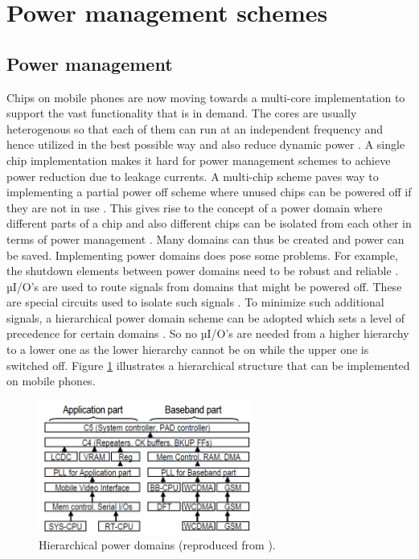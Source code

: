 \documentclass[journal]{IEEEtran}
\begin{document}
\section{Power management schemes}
\subsection{Power management}
Chips on mobile phones are now moving towards a multi-core implementation to support the vast functionality that is in demand. The cores are usually heterogenous so that each of them can run at an independent frequency and hence utilized in the best possible way and also reduce dynamic power \cite{HierarchicalPower}. A single chip implementation makes it hard for power management schemes to achieve power reduction due to leakage currents. A multi-chip scheme paves way to implementing a partial power off scheme where unused chips can be powered off if they are not in use \cite{HierarchicalPower}. This gives rise to the concept of a power domain where different parts of a chip and also different chips can be isolated from each other in terms of power management \cite{HierarchicalPower}. Many domains can thus be created and power can be saved. Implementing power domains does pose some problems. For example, the shutdown elements between power domains need to be robust and reliable \cite{HierarchicalPower}. µI/O’s are used to route signals from domains that might be powered off. These are special circuits used to isolate such signals \cite{HierarchicalPower}. To minimize such additional signals, a hierarchical power domain scheme can be adopted which sets a level of precedence for certain domains \cite{HierarchicalPower}. So no µI/O’s are needed from a higher hierarchy to a lower one as the lower hierarchy cannot be on while the upper one is switched off. Figure \ref{Figure:Hier} illustrates a hierarchical structure that can be implemented on mobile phones.

	\begin{figure}[h]
	   \centering
	   \includegraphics[width = 7cm]{Hier}
	   \caption{Hierarchical power domains (reproduced from \cite{HierarchicalPower}).}
	   \label{Figure:Hier}
	\end{figure}	
	\FloatBarrier
\end{document}
